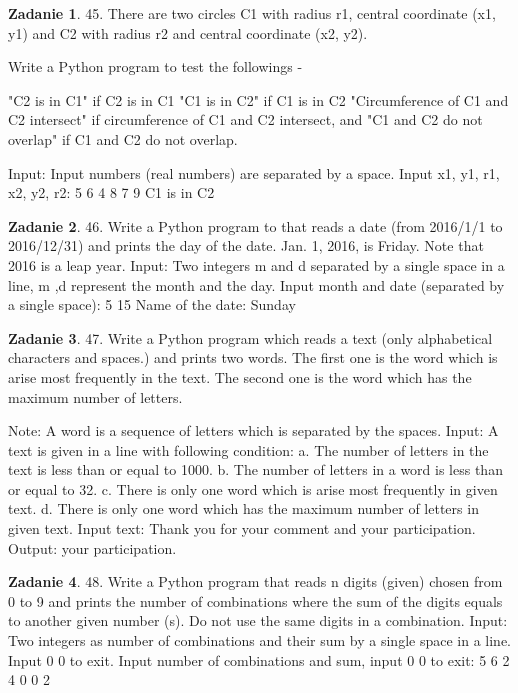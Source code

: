\documentclass[11pt]{article}
\theoremstyle{definition}
\newtheorem{zadanie}{Zadanie}
\begin{document}
\begin{zadanie}


45. There are two circles C1 with radius r1, central coordinate (x1, y1) and C2 with radius r2 and central coordinate (x2, y2). 

Write a Python program to test the followings -

    "C2 is in C1" if C2 is in C1
    "C1 is in C2" if C1 is in C2
    "Circumference of C1 and C2 intersect" if circumference of C1 and C2 intersect, and
    "C1 and C2 do not overlap" if C1 and C2 do not overlap.

Input:
Input numbers (real numbers) are separated by a space.
Input x1, y1, r1, x2, y2, r2:
5 6 4 8 7 9
C1 is in C2

\end{zadanie}

\begin{zadanie}


46. Write a Python program to that reads a date (from 2016/1/1 to 2016/12/31) and prints the day of the date. Jan. 1, 2016, is Friday. Note that 2016 is a leap year. 
Input:
Two integers m and d separated by a single space in a line, m ,d represent the month and the day.
Input month and date (separated by a single space):
5 15
Name of the date: Sunday

\end{zadanie}

\begin{zadanie}


47. Write a Python program which reads a text (only alphabetical characters and spaces.) and prints two words. The first one is the word which is arise most frequently in the text. The second one is the word which has the maximum number of letters. 

Note: A word is a sequence of letters which is separated by the spaces.
Input:
A text is given in a line with following condition:
a. The number of letters in the text is less than or equal to 1000.
b. The number of letters in a word is less than or equal to 32.
c. There is only one word which is arise most frequently in given text.
d. There is only one word which has the maximum number of letters in given text.
Input text: Thank you for your comment and your participation.
Output: your participation.

\end{zadanie}

\begin{zadanie}


48. Write a Python program that reads n digits (given) chosen from 0 to 9 and prints the number of combinations where the sum of the digits equals to another given number (s). Do not use the same digits in a combination. 
Input:
Two integers as number of combinations and their sum by a single space in a line. Input 0 0 to exit.
Input number of combinations and sum, input 0 0 to exit:
5 6
2 4
0 0
2

\end{zadanie}
\end{document}
